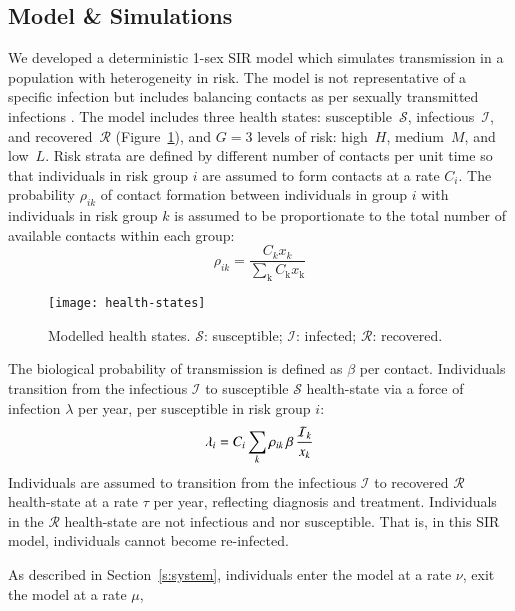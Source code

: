 \subsection{Model \& Simulations}\label{ss:model-sim}
We developed a deterministic 1-sex SIR model
which simulates transmission in a population with heterogeneity in risk.
The model is not representative of a specific infection
but includes balancing contacts
as per sexually transmitted infections \citep{Garnett1994}.
The model includes three health states:
susceptible~$\mathcal{S}$, infectious~$\mathcal{I}$, and recovered~$\mathcal{R}$
(Figure~\ref{fig:health-states}),
and $G = 3$ levels of risk:
high~$H$, medium~$M$, and low~$L$.
Risk strata are defined by different number of contacts per unit time
so that individuals in risk group $i$ are assumed to
form contacts at a rate $C_{i}$.
The probability $\rho_{ik}$ of contact formation between individuals in group $i$
with individuals in risk group $k$ is assumed to be
proportionate to the total number of available contacts within each group:
\begin{equation}
  \rho_{ik} = \frac
    {C_k x_k}
    {\sum_{\mathrm{k}}C_{\mathrm{k}} x_{\mathrm{k}}}
    \label{eq:rho}
\end{equation}
\begin{figure}
  \centering
  \texttt{[image: health-states]}
  \caption{Modelled health states.
  $\mathcal{S}$: susceptible;
  $\mathcal{I}$: infected;
  $\mathcal{R}$: recovered.}
  \label{fig:health-states}
\end{figure}
\par
The biological probability of transmission is defined as $\beta$ per contact.
Individuals transition from the
infectious $\mathcal{I}$ to susceptible $\mathcal{S}$ health-state
via a force of infection $\lambda$ per year, per susceptible in risk group $i$:
\begin{equation}
  \lambda_{i} =
  C_{i} \sum_k \rho_{ik} \thinspace  \beta \thinspace \frac{\mathcal{I}_k}{x_k}
  \label{eq:foi}
\end{equation}
Individuals are assumed to transition from the
infectious $\mathcal{I}$ to recovered $\mathcal{R}$ health-state
at a rate $\tau$ per year, reflecting diagnosis and treatment.
Individuals in the $\mathcal{R}$ health-state are not infectious and nor susceptible.
That is, in this SIR model, individuals cannot become re-infected.
\par
As described in Section~\ref{s:system}, individuals
enter the model at a rate $\nu$,
exit the model at a rate $\mu$,
